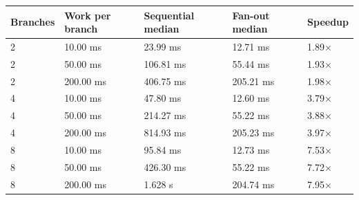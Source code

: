 \begin{tabular}{lllll}
\hline
Branches & Work per branch & Sequential median & Fan-out median & Speedup \\
\hline
2 & 10.00 ms & 23.99 ms & 12.71 ms & 1.89× \\
2 & 50.00 ms & 106.81 ms & 55.44 ms & 1.93× \\
2 & 200.00 ms & 406.75 ms & 205.21 ms & 1.98× \\
4 & 10.00 ms & 47.80 ms & 12.60 ms & 3.79× \\
4 & 50.00 ms & 214.27 ms & 55.22 ms & 3.88× \\
4 & 200.00 ms & 814.93 ms & 205.23 ms & 3.97× \\
8 & 10.00 ms & 95.84 ms & 12.73 ms & 7.53× \\
8 & 50.00 ms & 426.30 ms & 55.22 ms & 7.72× \\
8 & 200.00 ms & 1.628 s & 204.74 ms & 7.95× \\
\hline
\end{tabular}
